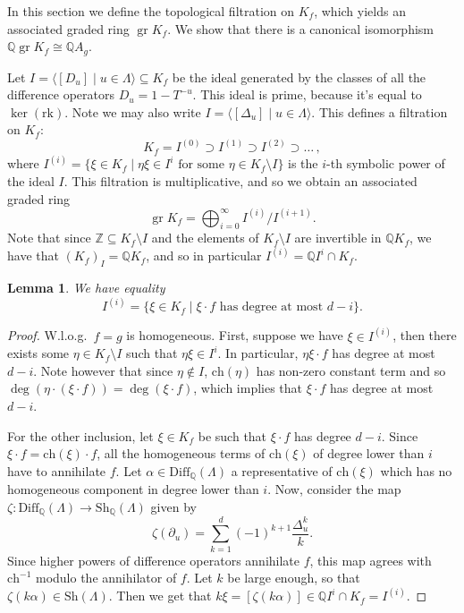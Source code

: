\documentclass[oneside]{amsart}
\theoremstyle{plain}
\newtheorem{lemma}[theorem]{Lemma}
\theoremstyle{definition}
\newcommand{\Z}{{\mathbb{Z}}}
\newcommand{\Q}{{\mathbb{Q}}}
\newcommand{\rk}{{\mathrm{rk}}}
\newcommand{\Diff}{{\mathrm{Diff}}}
\newcommand{\gr}{\operatorname{gr}}
\newcommand{\Sh}{{\mathrm{Sh}}}
\newcommand{\ch}{{\mathrm{ch}}}
\begin{document}
In this section we define the topological filtration on $K_f$, which yields an associated graded ring $\gr K_f$. We show that there is a canonical isomorphism $\Q\gr K_f \cong \Q A_g$.

Let $I = \langle [D_u] \mid u \in \Lambda \rangle \subseteq K_f$ be the ideal generated by the classes of all the difference operators $D_u = 1 - T^{-u}$. This ideal is prime, because it's equal to $\ker(\rk)$. Note we may also write $I = \langle [\Delta_u] \mid u \in \Lambda \rangle$.
This defines a filtration on $K_f$:
\[
    K_f = I^{(0)} \supset I^{(1)} \supset I^{(2)} \supset \dots\,,
\]
where $I^{(i)} = \{\xi \in K_f \mid \eta\xi \in I^i\textrm{ for some }\eta \in K_f\setminus I\}$ is the $i$-th symbolic power of the ideal $I$. This filtration is multiplicative, and so
we obtain an associated graded ring
\[
    \gr K_f = \bigoplus_{i=0}^\infty I^{(i)}/I^{(i+1)}.
\]
Note that since $\Z \subseteq K_f \setminus I$ and the elements of $K_f \setminus I$ are invertible in $\Q K_f$,
we have that $(K_f)_I = \Q K_f$, and so in particular $I^{(i)} = \Q I^i \cap K_f$.


\begin{lemma}
    \label{lem:filtration-characterization}
We have equality
    \[I^{(i)} = \{\xi \in K_f \mid \xi \cdot f \textrm{ has degree at most $d-i$}\}.\]
\end{lemma}

\begin{proof}
W.l.o.g.\ $f = g$ is homogeneous.
First, suppose we have $\xi \in I^{(i)}$, then there exists some $\eta \in K_f \setminus I$ such that
$\eta\xi \in I^i$. In particular, $\eta\xi \cdot f$ has degree at most $d-i$. Note however that since $\eta \notin I$, $\ch(\eta)$ has non-zero constant term and so $\deg(\eta\cdot(\xi \cdot f)) = \deg(\xi \cdot f)$, which implies that $\xi \cdot f$ has degree at most $d-i$.

For the other inclusion, let $\xi \in K_f$ be such that $\xi \cdot f$ has degree $d-i$. 
Since $\xi \cdot f = \ch(\xi) \cdot f$, all the homogeneous terms of $\ch(\xi)$ of degree lower than $i$ have to annihilate $f$. Let $\alpha \in \Diff_\Q(\Lambda)$ a representative of $\ch(\xi)$ which has no homogeneous component in degree lower than $i$. Now, consider the map $\zeta: \Diff_\Q(\Lambda) \to \Sh_\Q(\Lambda)$ given by
\[
\zeta(\partial_u)
= \sum_{k=1}^d (-1)^{k + 1}\frac{\Delta_u^k}{k}.
\]
Since higher powers of difference operators annihilate $f$, this map agrees with $\ch^{-1}$ modulo the annihilator of $f$. Let $k$ be large enough, so that $\zeta(k\alpha) \in \Sh(\Lambda)$.
Then we get that $k\xi = [\zeta(k \alpha)] \in \Q I^i \cap K_f = I^{(i)}$.
\end{proof}
\end{document}
